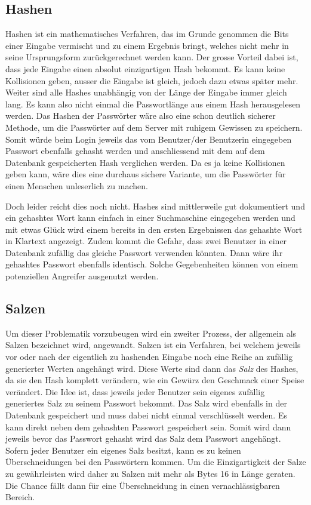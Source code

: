 \documentclass[../main.tex]{subfiles}
\begin{document}
	\subsection{Hashen}
	Hashen ist ein mathematisches Verfahren, das im Grunde genommen die Bits einer Eingabe vermischt und zu einem Ergebnis bringt, welches nicht mehr in seine Ursprungsform zurückgerechnet werden kann. Der grosse Vorteil dabei ist, dass jede Eingabe einen absolut einzigartigen Hash bekommt. Es kann keine Kollisionen geben, ausser die Eingabe ist gleich, jedoch dazu etwas später mehr. Weiter sind alle Hashes unabhängig von der Länge der Eingabe immer gleich lang. Es kann also nicht einmal die Passwortlänge aus einem Hash herausgelesen werden. Das Hashen der Passwörter wäre also eine schon deutlich sicherer Methode, um die Passwörter auf dem Server mit ruhigem Gewissen zu speichern. Somit würde beim Login jeweils das vom Benutzer/der Benutzerin eingegeben Passwort ebenfalls gehasht werden und anschliessend mit dem auf dem Datenbank gespeicherten Hash verglichen werden. Da es ja keine Kollisionen geben kann, wäre dies eine durchaus sichere Variante, um die Passwörter für einen Menschen unleserlich zu machen. 
	
	Doch leider reicht dies noch nicht. Hashes sind mittlerweile gut dokumentiert und ein gehashtes Wort kann einfach in einer Suchmaschine eingegeben werden und mit etwas Glück wird einem bereits in den ersten Ergebnissen das gehashte Wort in Klartext angezeigt. Zudem kommt die Gefahr, dass zwei Benutzer in einer Datenbank zufällig das gleiche Passwort verwenden könnten. Dann wäre ihr gehashtes Passwort ebenfalls identisch. Solche Gegebenheiten können von einem potenziellen Angreifer ausgenutzt werden. \cite{defuse} \cite{security}
	
	\subsection{Salzen}
	Um dieser Problematik vorzubeugen wird ein zweiter Prozess, der allgemein als Salzen bezeichnet wird, angewandt. Salzen ist ein Verfahren, bei welchem jeweils vor oder nach der eigentlich zu hashenden Eingabe noch eine Reihe an zufällig generierter Werten angehängt wird. Diese Werte sind dann das \emph{Salz} des Hashes, da sie den Hash komplett verändern, wie ein Gewürz den Geschmack einer Speise verändert. Die Idee ist, dass jeweils jeder Benutzer sein eigenes zufällig generiertes Salz zu seinem Passwort bekommt. Das Salz wird ebenfalls in der Datenbank gespeichert und muss dabei nicht einmal verschlüsselt werden. Es kann direkt neben dem gehashten Passwort gespeichert sein. Somit wird dann jeweils bevor das Passwort gehasht wird das Salz dem Passwort angehängt. Sofern jeder Benutzer ein eigenes Salz besitzt, kann es zu keinen Überschneidungen bei den Passwörtern kommen. Um die Einzigartigkeit der Salze zu gewährleisten wird daher zu Salzen mit mehr als Bytes 16 in Länge geraten. Die Chance fällt dann für eine Überschneidung in einen vernachlässigbaren Bereich. 
	
\end{document}
